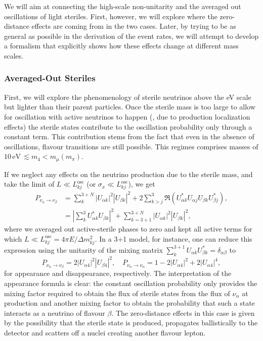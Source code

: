 We will aim at connecting the high-scale non-unitarity and the averaged out oscillations of light steriles. First, however, we will explore where the zero-distance effects are coming from in the two cases. Later, by trying to be as general as possible in the derivation of the event rates, we will attempt to develop a formalism that explicitly shows how these effects change at different mass scales. 

\subsubsection{Averaged-Out Steriles} First, we will explore the phenomenology of sterile neutrinos above the eV scale but lighter than their parent particles. Once the sterile mass is too large to allow for oscillation with active neutrinos to happen (\eg, due to production localization effects) the sterile states contribute to the oscillation probability only through a constant term. This contribution stems from the fact that even in the absence of oscillations, flavour transitions are still possible. This regimes comprises masses of $10 \, \text{eV}\, \lesssim m_{4} < m_{\mu} (m_{\pi}) $. 

If we neglect any effects on the neutrino production due to the sterile mass, and take the limit of $L \ll L^{\text{osc}}_{k j}$ (or $\sigma_x \ll L^{\text{osc}}_{k j}$), we get
%
\begin{align}
 P_{\nu_{\alpha} \to \nu_{\beta}} &= \sum_{k}^{3+N} |U_{\alpha k}|^2|U_{\beta k}|^2 + 2 \sum_{k > j}^{3}\Re{\left( U^*_{\alpha k} U_{\alpha j} U_{\beta k} U^*_{\beta j} \right)}, \nonumber \\
 &= \left| \sum_{k}^{3} U_{\alpha k}^* U_{\beta k} \right|^2 + \sum_{k=3+1}^{3+N} |U_{\alpha k}|^2 |U_{\beta k}|^2,
\end{align}
%
where we averaged out active-sterile phases to zero and kept all active terms for which $L \ll L^{\text{osc}}_{k j}= 4 \pi E / \Delta m^2_{k j}$. In a 3+1 model, for instance, one can reduce this expression using the unitarity of the mixing matrix $\sum_k^{3+1} U_{\alpha k} U_{\beta k}^* = \delta_{\alpha \beta}$ to
%
\begin{equation}
 P_{\nu_{\alpha} \to \nu_{\beta}} = 2 |U_{\alpha 4}|^2 |U_{\beta 4}|^2,\quad P_{\nu_{\alpha} \to \nu_{\alpha}} = 1 - 2 |U_{\alpha 4}|^2 + 2|U_{\alpha 4}|^4,\label{eq:AOS3+1dis}
\end{equation}
%
for appearance and disappearance, respectively. The interpretation of the appearance formula is clear: the constant oscillation probability only provides the mixing factor required to obtain the flux of sterile states from the flux of $\nu_{\alpha}$ at production and another mixing factor to obtain the probability that such a state interacts as a neutrino of flavour $\beta$. The zero-distance effects in this case is given by the possibility that the sterile state is produced, propagates ballistically to the detector and scatters off a nuclei creating another flavour lepton.

